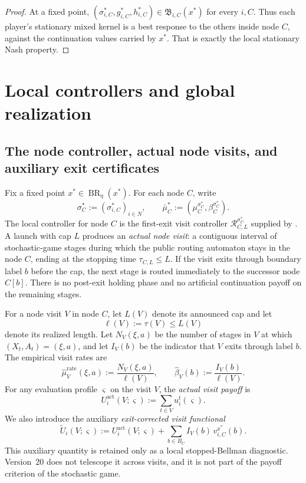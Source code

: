 \documentclass[12pt]{article}
\theoremstyle{definition}
\newcommand{\1}{\mathbf{1}}
\DeclareMathOperator{\BR}{BR}
\begin{document}
\begin{proof}
At a fixed point,
$(\sigma_{i,C}^*,g_{i,C}^*,h_{i,C}^*)\in\mathfrak B_{i,C}(x^*)$ for every $i,C$.
Thus each player's stationary mixed kernel is a best response to the others inside
node $C$, against the continuation values carried by $x^*$. That is exactly the
local stationary Nash property.
\end{proof}


\section{Local controllers and global realization}
\label{sec:realization}

\subsection{The node controller, actual node visits, and auxiliary exit certificates}

Fix a fixed point $x^*\in\BR_\eta(x^*)$. For each node $C$, write
\[
\sigma_C^*:=(\sigma_{i,C}^*)_{i\in N},
\qquad
\bar\mu_C^*:=(\mu_C^{\sigma_C^*},\beta_C^{\sigma_C^*}).
\]
The local controller for node $C$ is the first-exit visit controller
$\mathcal R_{C,L}^{\sigma_C^*}$ supplied by . A
launch with cap $L$ produces an \emph{actual node visit}: a contiguous interval
of stochastic-game stages during which the public routing automaton stays in the
node $C$, ending at the stopping time $\tau_{C,L}\le L$. If the visit exits
through boundary label $b$ before the cap, the next stage is routed immediately
to the successor node $C[b]$. There is no post-exit holding phase and no
artificial continuation payoff on the remaining stages.

For a node visit $V$ in node $C$, let $L(V)$ denote its announced cap and let
\[
\ell(V):=\tau(V)\le L(V)
\]
denote its realized length. Let $N_V(\xi,a)$ be the number of stages in $V$ at
which $(X_t,A_t)=(\xi,a)$, and let $I_V(b)$ be the indicator that $V$ exits
through label $b$. The empirical visit rates are
\[
\widehat\mu_V^{\mathrm{rate}}(\xi,a):=\frac{N_V(\xi,a)}{\ell(V)},
\qquad
\widehat\beta_V(b):=\frac{I_V(b)}{\ell(V)}.
\]
For any evaluation profile $\varsigma$ on the visit $V$, the \emph{actual visit
payoff} is
\begin{equation}
\label{eq:visit-actual-payoff}
U_i^{\mathrm{act}}(V;\varsigma)
:=
\sum_{t\in V} u_i^t(\varsigma).
\end{equation}
We also introduce the auxiliary \emph{exit-corrected visit functional}
\begin{equation}
\label{eq:visit-aux-payoff}
\widetilde U_i(V;\varsigma)
:=
U_i^{\mathrm{act}}(V;\varsigma)
+
\sum_{b\in B_C}I_V(b)\,v_{i,C}^{x^*}(b).
\end{equation}
This auxiliary quantity is retained only as a local stopped-Bellman diagnostic.
Version~20 does not telescope it across visits, and it is not part of the payoff
criterion of the stochastic game.
\end{document}
